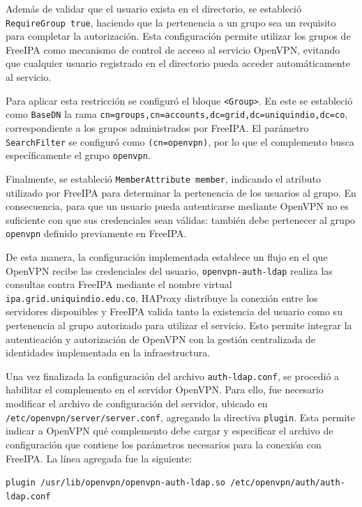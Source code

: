 Además de validar que el usuario exista en el directorio, se estableció \texttt{RequireGroup true}, haciendo que la pertenencia a un grupo sea un requisito para completar la autorización. Esta configuración permite utilizar los grupos de FreeIPA como mecanismo de control de acceso al servicio OpenVPN, evitando que cualquier usuario registrado en el directorio pueda acceder automáticamente al servicio.

Para aplicar esta restricción se configuró el bloque \texttt{<Group>}. En este se estableció como \texttt{BaseDN} la rama \texttt{cn=groups,cn=accounts,dc=grid,dc=uniquindio,dc=co}, correspondiente a los grupos administrados por FreeIPA. El parámetro \texttt{SearchFilter} se configuró como \texttt{(cn=openvpn)}, por lo que el complemento busca específicamente el grupo \texttt{openvpn}.

Finalmente, se estableció \texttt{MemberAttribute member}, indicando el atributo utilizado por FreeIPA para determinar la pertenencia de los usuarios al grupo. En consecuencia, para que un usuario pueda autenticarse mediante OpenVPN no es suficiente con que sus credenciales sean válidas: también debe pertenecer al grupo \texttt{openvpn} definido previamente en FreeIPA.

De esta manera, la configuración implementada establece un flujo en el que OpenVPN recibe las credenciales del usuario, \texttt{openvpn-auth-ldap} realiza las consultas contra FreeIPA mediante el nombre virtual \texttt{ipa.grid.uniquindio.edu.co}, HAProxy distribuye la conexión entre los servidores disponibles y FreeIPA valida tanto la existencia del usuario como su pertenencia al grupo autorizado para utilizar el servicio. Esto permite integrar la autenticación y autorización de OpenVPN con la gestión centralizada de identidades implementada en la infraestructura.

Una vez finalizada la configuración del archivo \texttt{auth-ldap.conf}, se procedió a habilitar el complemento en el servidor OpenVPN. Para ello, fue necesario modificar el archivo de configuración del servidor, ubicado en \texttt{/etc/openvpn/server/server.conf}, agregando la directiva \texttt{plugin}. Esta permite indicar a OpenVPN qué complemento debe cargar y especificar el archivo de configuración que contiene los parámetros necesarios para la conexión con FreeIPA. La línea agregada fue la siguiente:

\begin{center}
	\texttt{plugin /usr/lib/openvpn/openvpn-auth-ldap.so /etc/openvpn/auth/auth-ldap.conf}
\end{center}


